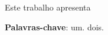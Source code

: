 \documentclass[
	12pt,				%
	openright,			%
	oneside,			%
	a4paper,			%
	chapter=TITLE,		%
	english,			%
	french,				%
	spanish,			%
	brazil				%
	]{abntex2}
\begin{document}
\frenchspacing



\imprimircapa
\imprimirfolhaderosto* %

%



\imprimiraprovacao
\cleardoublepage








\setlength{\absparsep}{18pt} %
\begin{resumo}
    Este trabalho apresenta

    \textbf{Palavras-chave}: um. dois.
\end{resumo}
\end{document}
